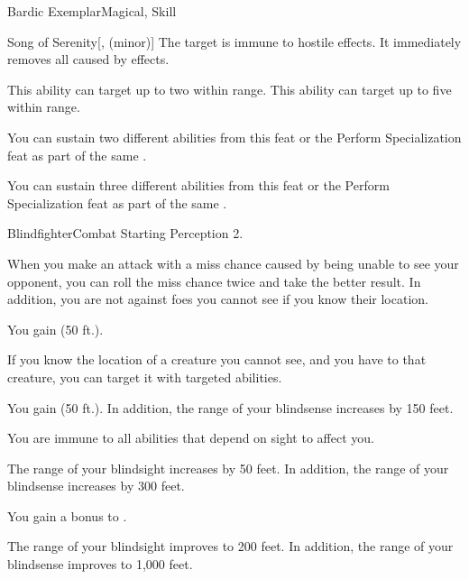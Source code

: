 \begin{feat}{Bardic Exemplar}{Magical, Skill}
\begin{freeability}{Song of Serenity}[,  (minor)]
            The target is immune to hostile  effects.
            It immediately removes all  caused by  effects.

            \rankline
             This ability can target up to two  within \rngmed range.
             This ability can target up to five  within \rngmed range.
        \end{freeability}

         You can sustain two different  abilities from this feat or the Perform Specialization feat as part of the same .

         You can sustain three different  abilities from this feat or the Perform Specialization feat as part of the same .
    \end{feat}

    \begin{feat}{Blindfighter}{Combat}
        \featpre Starting Perception 2.

         When you make an attack with a miss chance caused by being unable to see your opponent, you can roll the miss chance twice and take the better result.
        In addition, you are not  against foes you cannot see if you know their location.

         You gain  (50 ft.).

         If you know the location of a creature you cannot see, and you have  to that creature, you can target it with targeted abilities.

         You gain  (50 ft.).
        In addition, the range of your blindsense increases by 150 feet.

         You are immune to all abilities that depend on sight to affect you.

         The range of your blindsight increases by 50 feet.
        In addition, the range of your blindsense increases by 300 feet.

         You gain a  bonus to .

         The range of your blindsight improves to 200 feet.
        In addition, the range of your blindsense improves to 1,000 feet.
    \end{feat}

